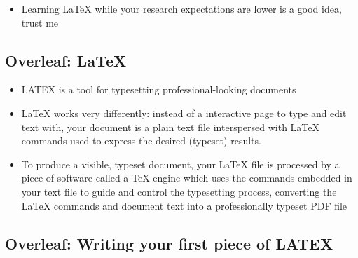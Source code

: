 \documentclass[
  letterpaper,
  DIV=11,
  numbers=noendperiod]{scrartcl}
\providecommand{\tightlist}{%
  \setlength{\itemsep}{0pt}\setlength{\parskip}{0pt}}\usepackage{longtable,booktabs,array}
\begin{document}
\begin{tcolorbox}[enhanced jigsaw, colframe=quarto-callout-tip-color-frame, bottomrule=.15mm, toptitle=1mm, opacitybacktitle=0.6, colback=white, opacityback=0, colbacktitle=quarto-callout-tip-color!10!white, titlerule=0mm, toprule=.15mm, coltitle=black, left=2mm, arc=.35mm, bottomtitle=1mm, rightrule=.15mm, title=\textcolor{quarto-callout-tip-color}{\faLightbulb}\hspace{0.5em}{Learning Overleaf!}, breakable, leftrule=.75mm]

\begin{itemize}
\tightlist
\item
  Learning LaTeX while your research expectations are lower is a good
  idea, trust me
\end{itemize}

\end{tcolorbox}

\subsection{Overleaf: LaTeX}\label{overleaf-latex}

\begin{itemize}
\tightlist
\item
  LATEX is a tool for typesetting professional-looking documents
\item
  LaTeX works very differently: instead of a interactive page to type
  and edit text with, your document is a plain text file interspersed
  with LaTeX commands used to express the desired (typeset) results.
\item
  To produce a visible, typeset document, your LaTeX file is processed
  by a piece of software called a TeX engine which uses the commands
  embedded in your text file to guide and control the typesetting
  process, converting the LaTeX commands and document text into a
  professionally typeset PDF file
\end{itemize}

\subsection{Overleaf: Writing your first piece of
LATEX}\label{overleaf-writing-your-first-piece-of-latex}
\end{document}
